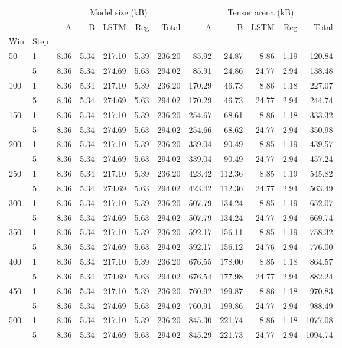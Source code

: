 \begin{tabular}{llrrrrrrrrrr}
\toprule
 &  & \multicolumn{5}{c}{Model size (kB)} & \multicolumn{5}{c}{Tensor arena (kB)} \\
 &  & A & B & LSTM & Reg & Total & A & B & LSTM & Reg & Total \\
Win & Step &  &  &  &  &  &  &  &  &  &  \\
\midrule
\multirow[t]{2}{*}{50} & 1 & 8.36 & 5.34 & 217.10 & 5.39 & 236.20 & 85.92 & 24.87 & 8.86 & 1.19 & 120.84 \\
 & 5 & 8.36 & 5.34 & 274.69 & 5.63 & 294.02 & 85.91 & 24.86 & 24.77 & 2.94 & 138.48 \\
\cline{1-12}
\multirow[t]{2}{*}{100} & 1 & 8.36 & 5.34 & 217.10 & 5.39 & 236.20 & 170.29 & 46.73 & 8.86 & 1.18 & 227.07 \\
 & 5 & 8.36 & 5.34 & 274.69 & 5.63 & 294.02 & 170.29 & 46.73 & 24.77 & 2.94 & 244.74 \\
\cline{1-12}
\multirow[t]{2}{*}{150} & 1 & 8.36 & 5.34 & 217.10 & 5.39 & 236.20 & 254.67 & 68.61 & 8.86 & 1.18 & 333.32 \\
 & 5 & 8.36 & 5.34 & 274.69 & 5.63 & 294.02 & 254.66 & 68.62 & 24.77 & 2.94 & 350.98 \\
\cline{1-12}
\multirow[t]{2}{*}{200} & 1 & 8.36 & 5.34 & 217.10 & 5.39 & 236.20 & 339.04 & 90.49 & 8.85 & 1.19 & 439.57 \\
 & 5 & 8.36 & 5.34 & 274.69 & 5.63 & 294.02 & 339.04 & 90.49 & 24.77 & 2.94 & 457.24 \\
\cline{1-12}
\multirow[t]{2}{*}{250} & 1 & 8.36 & 5.34 & 217.10 & 5.39 & 236.20 & 423.42 & 112.36 & 8.85 & 1.19 & 545.82 \\
 & 5 & 8.36 & 5.34 & 274.69 & 5.63 & 294.02 & 423.42 & 112.36 & 24.77 & 2.94 & 563.49 \\
\cline{1-12}
\multirow[t]{2}{*}{300} & 1 & 8.36 & 5.34 & 217.10 & 5.39 & 236.20 & 507.79 & 134.24 & 8.85 & 1.19 & 652.07 \\
 & 5 & 8.36 & 5.34 & 274.69 & 5.63 & 294.02 & 507.79 & 134.24 & 24.77 & 2.94 & 669.74 \\
\cline{1-12}
\multirow[t]{2}{*}{350} & 1 & 8.36 & 5.34 & 217.10 & 5.39 & 236.20 & 592.17 & 156.11 & 8.85 & 1.19 & 758.32 \\
 & 5 & 8.36 & 5.34 & 274.69 & 5.63 & 294.02 & 592.17 & 156.12 & 24.76 & 2.94 & 776.00 \\
\cline{1-12}
\multirow[t]{2}{*}{400} & 1 & 8.36 & 5.34 & 217.10 & 5.39 & 236.20 & 676.55 & 178.00 & 8.85 & 1.18 & 864.57 \\
 & 5 & 8.36 & 5.34 & 274.69 & 5.63 & 294.02 & 676.54 & 177.98 & 24.77 & 2.94 & 882.24 \\
\cline{1-12}
\multirow[t]{2}{*}{450} & 1 & 8.36 & 5.34 & 217.10 & 5.39 & 236.20 & 760.92 & 199.87 & 8.86 & 1.18 & 970.83 \\
 & 5 & 8.36 & 5.34 & 274.69 & 5.63 & 294.02 & 760.91 & 199.86 & 24.77 & 2.94 & 988.49 \\
\cline{1-12}
\multirow[t]{2}{*}{500} & 1 & 8.36 & 5.34 & 217.10 & 5.39 & 236.20 & 845.30 & 221.74 & 8.86 & 1.18 & 1077.08 \\
 & 5 & 8.36 & 5.34 & 274.69 & 5.63 & 294.02 & 845.29 & 221.73 & 24.77 & 2.94 & 1094.74 \\
\cline{1-12}
\bottomrule
\end{tabular}
